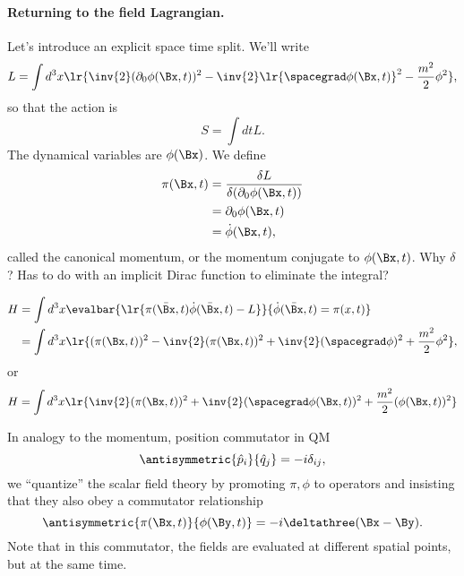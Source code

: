 \paragraph{Returning to the field Lagrangian.}
Let's introduce an explicit space time split.  We'll write
\begin{equation}\label{eqn:qftLecture4:880}
L = \int d^3 x \lr{
\inv{2} (\partial_0 \phi(\Bx, t))^2 - \inv{2} \lr{ \spacegrad \phi(\Bx, t) }^2 - \frac{m^2}{2} \phi^2
},
\end{equation}
so that the action is
\begin{equation}\label{eqn:qftLecture4:900}
S = \int dt L.
\end{equation}
The dynamical variables are \( \phi(\Bx) \).  We define
\begin{equation}\label{eqn:qftLecture4:920}
\begin{aligned}
\pi(\Bx, t)
&= \frac{\delta L}{\delta (\partial_0 \phi(\Bx, t))} \\
&= \partial_0 \phi(\Bx, t) \\
&= \dot{\phi}(\Bx, t),
\end{aligned}
\end{equation}
called the canonical momentum, or the momentum conjugate to \( \phi(\Bx, t) \).
Why \( \delta \)?  Has to do with an implicit Dirac function to eliminate the integral?

\begin{equation}\label{eqn:qftLecture4:940}
\begin{aligned}
H
&= \int d^3 x \evalbar{\lr{ \pi(\bar{\Bx}, t) \dot{\phi}(\bar{\Bx}, t) - L }}{\dot{\phi}(\bar{\Bx}, t) = \pi(x, t) } \\
&= \int d^3 x \lr{ (\pi(\Bx, t))^2 - \inv{2} (\pi(\Bx, t))^2 + \inv{2} (\spacegrad \phi)^2 + \frac{m^2}{2} \phi^2 },
\end{aligned}
\end{equation}
or
\begin{equation}\label{eqn:qftLecture4:960}
H = \int d^3 x \lr{ \inv{2} (\pi(\Bx, t))^2 + \inv{2} (\spacegrad \phi(\Bx, t))^2 + \frac{m^2}{2} (\phi(\Bx, t))^2 }
\end{equation}

In analogy to the momentum, position commutator in QM
\begin{equation}\label{eqn:qftLecture4:1000}
\antisymmetric{\hat{p}_i}{\hat{q}_j} = -i \delta_{ij},
\end{equation}
we ``quantize'' the scalar field theory by promoting \( \pi, \phi \) to operators and insisting that they also obey a commutator relationship
\begin{equation}\label{eqn:qftLecture4:980}
\antisymmetric{\pi(\Bx, t)}{\phi(\By, t)} = -i \deltathree(\Bx - \By).
\end{equation}
Note that in this commutator, the fields are evaluated at different spatial points, but at the same time.
